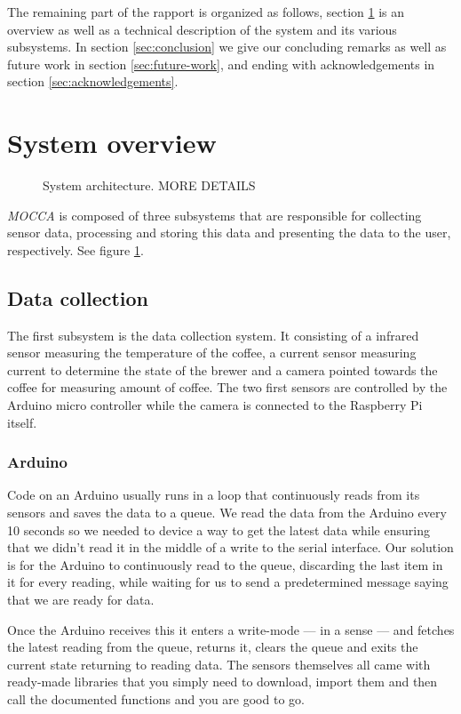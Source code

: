 \documentclass[12pt,a4paper,oneside,article]{memoir}
\numberwithin{equation}{chapter}
\begin{document}
The remaining part of the rapport is organized as follows, section 
\ref{sec:system-overview} is an overview as well as a technical
description of the system and its various subsystems. In section
\ref{sec:conclusion} we give our concluding remarks as well as future work in
section \ref{sec:future-work}, and ending with acknowledgements in section 
\ref{sec:acknowledgements}.

\section{System overview}\label{sec:system-overview}
\begin{figure}[h]
  \centerfloat{}
  \scalebox{.75}{}
  \caption{System architecture. MORE DETAILS}\label{fig:architecture}
\end{figure}
\textit{MOCCA} is composed of three subsystems that are responsible for
collecting sensor data, processing and storing this data and presenting the data
to the user, respectively. See figure \ref{fig:architecture}.

\subsection{Data collection}\label{sec:data-collection}
The first subsystem is the data collection system. It consisting of a 
infrared sensor measuring the temperature of the coffee, a current sensor 
measuring current to determine the state of the brewer and a camera pointed 
towards the coffee for measuring amount of coffee. The two first sensors are 
controlled by the Arduino micro controller while the camera is 
connected to the Raspberry Pi itself.

\subsubsection{Arduino}\label{sec:arduino}
Code on an Arduino usually runs in a loop that continuously reads from 
its sensors and saves the data to a queue. We read the data from the 
Arduino every 10 seconds so we needed to device a way to get the latest data 
while ensuring that we didn't read it in the middle of a write to the serial 
interface. Our solution is for the Arduino to continuously read to the queue, 
discarding the last item in it for every reading, while waiting for us to send 
a predetermined message saying that we are ready for data.

Once the Arduino receives this it enters a write-mode --- in a sense --- and
fetches the latest reading from the queue, returns it, clears the queue and
exits the current state returning to reading data. The sensors themselves all
came with ready-made libraries that you simply need to download, import them and
then call the documented functions and you are good to go.
\end{document}
